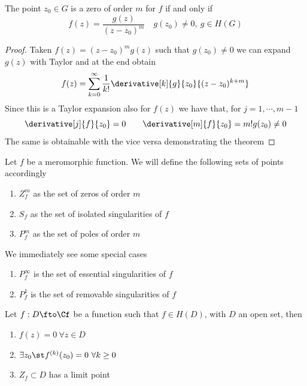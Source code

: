 \documentclass[../mmf.tex]{subfiles}
\begin{document}
\begin{thm}
	The point $z_0\in G$ is a zero of order $m$ for $f$ if and only if
	\begin{equation*}
		f(z)=\frac{g(z)}{(z-z_0)^m}\quad g(z_0)\ne0,\ g\in H(G)
	\end{equation*}
\end{thm}
\begin{proof}
	Taken $f(z)=(z-z_0)^mg(z)$ such that $g(z_0)\ne0$ we can expand $g(z)$ with Taylor and at the end obtain
	\begin{equation*}
		f(z)=\sum_{k=0}^{\infty}\frac{1}{k!}\derivative[k]{g}{z_0}{(z-z_0)^{k+m}}
	\end{equation*}
	Since this is a Taylor expansion also for $f(z)$ we have that, for $j=1,\cdots,m-1$
	\begin{equation*}
		\derivative[j]{f}{z_0}=0\qquad\derivative[m]{f}{z_0}=m!g(z_0)\ne0
	\end{equation*}
	The same is obtainable with the vice versa demonstrating the theorem
\end{proof}
\begin{ntn}
	Let $f$ be a meromorphic function. We will define the following sets of points accordingly
	\begin{enumerate}
	\item $Z_f^m$ as the set of zeros of order $m$
	\item $S_f$ as the set of isolated singularities of $f$
	\item $P_f^m$ as the set of poles of order $m$
	\end{enumerate}
	We immediately see some special cases
	\begin{enumerate}
	\item $P_f^\infty$ is the set of essential singularities of $f$
	\item $P_f^1$ is the set of removable singularities of $f$
	\end{enumerate}
\end{ntn}
\begin{thm}
	Let $f:D\fto\Cf$ be a function such that $f\in H(D)$, with $D$ an open set, then
	\begin{enumerate}
	\item $f(z)=0\ \forall z\in D$
	\item $\exists z_0\st f^{(k)}(z_0)=0\ \forall k\ge0$
	\item $Z_f\subset D$ has a limit point
	\end{enumerate}
\end{thm}
\end{document}
